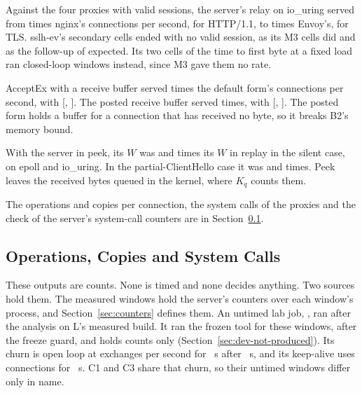  Against the four proxies with valid sessions, the server's relay on
io\_uring served from \SecRelayIouringSecRelayIouringLIouringHttpNginxValueMedian{} times nginx's
connections per second, for HTTP/1.1, to \SecRelayIouringSecRelayIouringLIouringTlsSniEnvoyValueMedian{}
times Envoy's, for TLS. sslh-ev's \CountSecSslh{} secondary cells ended with no valid session, as
its M3 cells did and as the follow-up of \JobSlOne{} expected. Its two cells of the time to first byte at a fixed
load ran closed-loop windows instead, since M3 gave them no rate.

 AcceptEx with a receive buffer served
\SecIocpFormsSecIocpFormsWIocpAcceptexBufferValueMedian{} times the default form's connections per
second, with [\SecIocpFormsSecIocpFormsWIocpAcceptexBufferValueLow,
\SecIocpFormsSecIocpFormsWIocpAcceptexBufferValueHigh]. The posted receive buffer served
\SecIocpFormsSecIocpFormsWIocpReceiveFormValueMedian{} times, with
[\SecIocpFormsSecIocpFormsWIocpReceiveFormValueLow, \SecIocpFormsSecIocpFormsWIocpReceiveFormValueHigh].
The posted form holds a buffer for a connection that has received no byte, so it breaks B2's memory
bound.

 With the server in peek, its $W$ was
\SecBThreeOtherModeSecBThreeOtherModeEpollSilentValueMedian{} and
\SecBThreeOtherModeSecBThreeOtherModeIouringSilentValueMedian{} times its $W$ in replay in the silent
case, on epoll and io\_uring. In the partial-ClientHello case it was
\SecBThreeOtherModeSecBThreeOtherModeEpollPartialHelloValueMedian{} and
\SecBThreeOtherModeSecBThreeOtherModeIouringPartialHelloValueMedian{} times. Peek leaves the received
bytes queued in the kernel, where $K_q$ counts them.

 The operations and copies per connection, the system calls of the proxies and the
check of the server's system-call counters are in Section~\ref{sec:res-ops}.

\subsection{Operations, Copies and System Calls}\label{sec:res-ops}

These outputs are counts. None is timed and none decides anything. Two sources hold them. The
measured windows hold the server's counters over each window's process, and Section~\ref{sec:counters}
defines them. An untimed lab job, \JobSt, ran after the analysis on L's measured build. It ran the
frozen tool for these windows, after the freeze guard, and holds counts only
(Section~\ref{sec:dev-not-produced}). Its churn is open loop at \TraceRate{} exchanges per second for
\TraceSeconds~s after \TraceWarmSeconds~s, and its keep-alive uses \TraceKaConns{} connections for
\TraceKaSeconds~s. C1 and C3 share that churn, so their untimed windows differ only in name.

